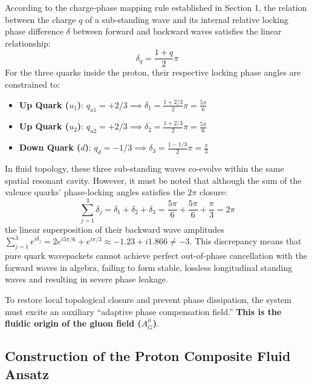 \documentclass[12pt, a4paper]{article}
\begin{document}
According to the charge-phase mapping rule established in Section 1, the relation between the charge $q$ of a sub-standing wave and its internal relative locking phase difference $\delta$ between forward and backward waves satisfies the linear relationship:
\begin{equation}
\delta_q = \frac{1+q}{2}\pi \label{eq:charge_phase}
\end{equation}
For the three quarks inside the proton, their respective locking phase angles are constrained to:
\begin{itemize}
    \item \textbf{Up Quark ($u_1$)}: $q_{u1} = +2/3 \implies \delta_1 = \frac{1 + 2/3}{2}\pi = \frac{5\pi}{6}$
    \item \textbf{Up Quark ($u_2$)}: $q_{u2} = +2/3 \implies \delta_2 = \frac{1 + 2/3}{2}\pi = \frac{5\pi}{6}$
    \item \textbf{Down Quark ($d$)}: $q_d = -1/3 \implies \delta_3 = \frac{1 - 1/3}{2}\pi = \frac{\pi}{3}$
\end{itemize}

In fluid topology, these three sub-standing waves co-evolve within the same spatial resonant cavity. However, it must be noted that although the sum of the valence quarks' phase-locking angles satisfies the $2\pi$ closure:
\begin{equation}
\sum_{j=1}^3 \delta_j = \delta_1 + \delta_2 + \delta_3 = \frac{5\pi}{6} + \frac{5\pi}{6} + \frac{\pi}{3} = 2\pi \label{eq:sum_phase}
\end{equation}
the linear superposition of their backward wave amplitudes $\sum_{j=1}^3 e^{i\delta_j} = 2e^{i5\pi/6} + e^{i\pi/3} \approx -1.23 + i1.866 \neq -3$. This discrepancy means that pure quark wavepackets cannot achieve perfect out-of-phase cancellation with the forward waves in algebra, failing to form stable, lossless longitudinal standing waves and resulting in severe phase leakage.

To restore local topological closure and prevent phase dissipation, the system must excite an auxiliary ``adaptive phase compensation field.'' \textbf{This is the fluidic origin of the gluon field ($A^\mu_G$)}.

\subsection{Construction of the Proton Composite Fluid Ansatz}
\end{document}
